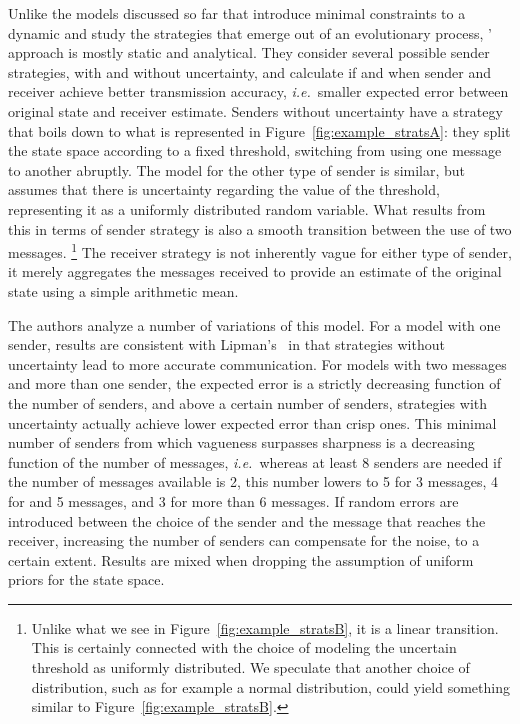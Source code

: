 \documentclass[a4paper]{article}
\begin{document}
Unlike the models discussed so far that introduce minimal constraints to a dynamic and study the strategies that emerge out of an evolutionary process, \citeauthor{lawry_vagueness_2017}' approach is mostly static and analytical.
They consider several possible sender strategies, with and without uncertainty, and calculate if and when sender and receiver achieve better transmission accuracy, \emph{i.e.}~smaller expected error between original state and receiver estimate.
Senders without uncertainty have a strategy that boils down to what is represented in Figure~\ref{fig:example_stratsA}: they split the state space according to a fixed threshold, switching from using one message to another abruptly.
The model for the other type of sender is similar, but assumes that there is uncertainty regarding the value of the threshold, representing it as a uniformly distributed random variable.
What results from this in terms of sender strategy is also a smooth transition between the use of two messages.%
\footnote{Unlike what we see in Figure~\ref{fig:example_stratsB}, it is a linear transition. This is certainly connected with the choice of modeling the uncertain threshold as uniformly distributed. We speculate that another choice of distribution, such as for example a normal distribution, could yield something similar to Figure~\ref{fig:example_stratsB}.}%
The receiver strategy is not inherently vague for either type of sender, it merely aggregates the messages received to provide an estimate of the original state using a simple arithmetic mean.

The authors analyze a number of variations of this model.
For a model with one sender, results are consistent with Lipman's~\parencite{lipman_why_2009} in that strategies without uncertainty lead to more accurate communication.
For models with two messages and more than one sender, the expected error is a strictly decreasing function of the number of senders, and above a certain number of senders, strategies with uncertainty actually achieve lower expected error than crisp ones.
This minimal number of senders from which vagueness surpasses sharpness is a decreasing function of the number of messages, \emph{i.e.}~whereas at least 8 senders are needed if the number of messages available is 2, this number lowers to 5 for 3 messages, 4 for and 5 messages, and 3 for more than 6 messages.
If random errors are introduced between the choice of the sender and the message that reaches the receiver, increasing the number of senders can compensate for the noise, to a certain extent.
Results are mixed when dropping the assumption of uniform priors for the state space.
\end{document}
